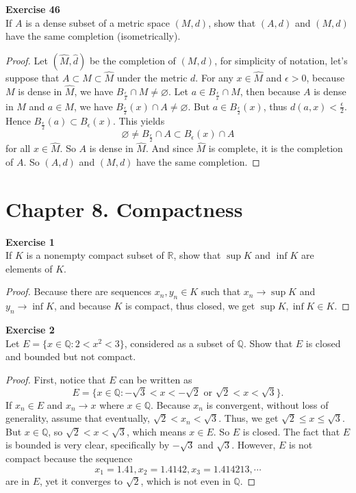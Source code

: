 \documentclass[12pt, a4paper]{article}
\theoremstyle{plain}
\newcommand{\Q}{\mathbb{Q}}
\newcommand{\R}{\mathbb{R}}
\newenvironment{exercise}[2][Exercise]
    { \begin{mdframed}[backgroundcolor=gray!20] \textbf{#1 #2} \\}
    {  \end{mdframed}}
\begin{document}
\begin{exercise}{46}
If $A$ is a dense subset of a metric space $(M,d)$, show that $(A,d)$ and $(M,d)$ have the same completion (isometrically).
\end{exercise}
	\begin{proof}
	Let $(\hat{M}, \hat{d})$ be the completion of $(M,d)$, for simplicity of notation, let's suppose that $A\subset M\subset \hat{M}$ under the metric $d$. For any $x\in \hat{M}$ and $\epsilon>0$, because $M$ is dense in $\hat{M}$, we have $B_\frac{\epsilon}{x}\cap M\neq \varnothing$. Let $a\in B_\frac{\epsilon}{x}\cap M$, then because $A$ is dense in $M$ and $a\in M$, we have $B_\frac{\epsilon}{2}(x)\cap A\neq \varnothing$. But $a\in B_\frac{\epsilon}{2}(x)$, thus $d(a,x)<\frac{\epsilon}{2}$. Hence $B_\frac{\epsilon}{2}(a)\subset B_\epsilon(x)$. This yields
	\[
	\varnothing\neq B_\frac{\epsilon}{2}\cap A\subset B_\epsilon(x)\cap A
	\]
	for all $x\in \hat{M}$. So $A$ is dense in $\hat{M}$. And since $\hat{M}$ is complete, it is the completion of $A$. So $(A,d)$ and $(M,d)$ have the same completion.
	\end{proof}
	
\section*{Chapter 8. Compactness}

\begin{exercise}{1}
If $K$ is a nonempty compact subset of $\R$, show that $\sup K$ and $\inf K$ are elements of $K$.
\end{exercise}
	\begin{proof}
	Because there are sequences $x_n,y_n\in K$ such that $x_n\rightarrow \sup K$ and $y_n\rightarrow \inf K$, and because $K$ is compact, thus closed, we get $\sup K, \inf K\in K$.
	\end{proof}
	
\begin{exercise}{2}
Let $E=\{x\in\Q :2<x^2<3\}$, considered as a subset of $\Q$. Show that $E$ is closed and bounded but not compact.
\end{exercise}
	\begin{proof}
	First, notice that $E$ can be written as 
	\[
	E=\{x\in\Q: -\sqrt{3}<x<-\sqrt{2}\text{ or }\sqrt{2}<x<\sqrt{3}\}.
	\]
	If $x_n\in E$ and $x_n\rightarrow x$ where $x\in\Q$. Because $x_n$ is convergent, without loss of generality, assume that eventually, $\sqrt{2}<x_n<\sqrt{3}$. Thus, we get $\sqrt{2}\leq x\leq \sqrt{3}$. But $x\in \Q$, so $\sqrt{2}<x<\sqrt{3}$, which means $x\in E$. So $E$ is closed. The fact that $E$ is bounded is very clear, specifically by $-\sqrt{3}$ and $\sqrt{3}$. However, $E$ is not compact because the sequence 
	\[
	x_1= 1.41, x_2=1.4142, x_3=1.414213,\cdots
	\]
	are in $E$, yet it converges to $\sqrt{2}$, which is not even in $\Q$.
	\end{proof}
\end{document}
